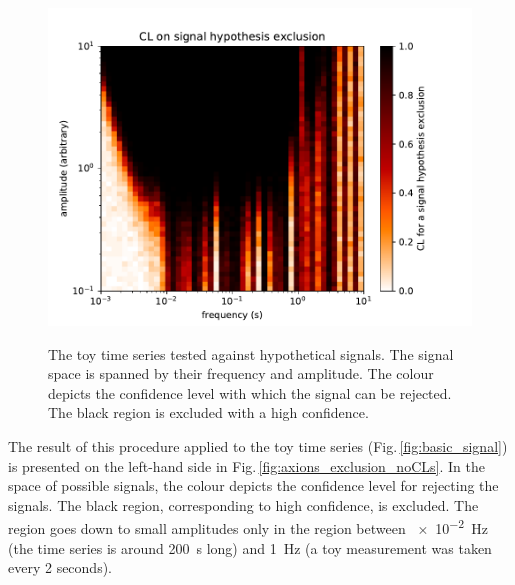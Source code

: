 \begin{figure}
  \centering
  \subfloat[The test without the use of the CLs method.]
  {\label{fig:axions_exclusion_noCLs}
  \includegraphics[width=.5\linewidth]{gfx/axions/basic_exclusion_noCls.pdf}}
  \caption{The toy time series tested against hypothetical signals. The signal space is spanned by their frequency and amplitude. The colour depicts the confidence level with which the signal can be rejected. The black region is excluded with a high confidence.}\label{fig:axions_exclusions}
\end{figure}

The result of this procedure applied to the toy time series (Fig.\,\ref{fig:basic_signal}) is presented on the left-hand side in Fig.\,\ref{fig:axions_exclusion_noCLs}. In the space of possible signals, the colour depicts the confidence level for rejecting the signals. The black region, corresponding to high confidence, is excluded. The region goes down to small amplitudes only in the region between \SI{e-2}{\hertz} (the time series is around \SI{200}{\second} long) and \SI{1}{\hertz} (a toy measurement was taken every 2 seconds).

